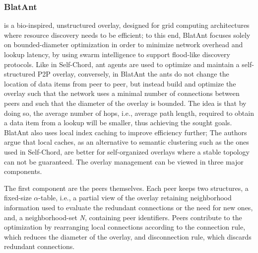 \documentclass[runningheads]{llncs}
\begin{document}
\subsubsection{BlatAnt} \cite{blatant} is a bio-inspired, unstructured overlay, designed for grid computing architectures where resource discovery needs to be efficient; to this end, BlatAnt focuses solely on bounded-diameter optimization in order to minimize network overhead and lookup latency, by using swarm intelligence to support flood-like discovery protocols. Like in Self-Chord, ant agents are used to optimize and maintain a self-structured P2P overlay, conversely, in BlatAnt the ants do not change the location of data items from peer to peer, but instead build and optimize the overlay such that the network uses a minimal number of connections between peers and such that the diameter of the overlay is bounded. The idea is that by doing so, the average number of hops, i.e., average path length, required to obtain a data item from a lookup will be smaller, thus achieving the sought goals. BlatAnt also uses local index caching to improve efficiency further; The authors argue that local caches,  as an alternative to semantic clustering such as the ones used in Self-Chord, are better for self-organized overlays where a stable topology can not be guaranteed. The overlay management can be viewed in three major components.

The first component are the peers themselves. Each peer keeps two structures, a   fixed-size $\alpha$-table, i.e., a partial view of the overlay retaining neighborhood information used to evaluate the redundant connections or the need for new ones, and, a neighborhood-set \textit{N}, containing peer identifiers. Peers contribute to the optimization by rearranging local connections according to the connection rule, which reduces the diameter of the overlay, and disconnection rule, which discards redundant connections.
\end{document}
